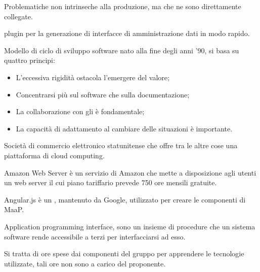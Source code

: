 





\makeFrontPage



\clearpage

\begin{itemize}


Problematiche non intrinseche alla produzione, ma che ne sono direttamente collegate.


 plugin per la generazione di interfacce di amministrazione dati in modo rapido.


Modello di ciclo di sviluppo software nato alla fine degli anni '90, si basa su quattro principi:
\begin{itemize}
 \item L'eccessiva rigidità ostacola l'emergere del valore;
 \item Concentrarsi più sul software che sulla documentazione;
 \item La collaborazione con gli  è fondamentale;
 \item La capacità di adattamento al cambiare delle situazioni è importante.
\end{itemize} 


Società di commercio elettronico statunitense che offre tra le altre cose una piattaforma di cloud computing.


Amazon Web Server è un servizio di Amazon che mette a disposizione agli utenti un web server il cui piano tariffario prevede 750 ore mensili gratuite.


Angular.js è un   , mantenuto da Google, utilizzato per creare le componenti  di MaaP.


Application programming interface, sono un insieme di procedure che un sistema software rende accessibile a terzi per interfacciarsi ad esso.


Si tratta di ore spese dai componenti del gruppo per apprendere le tecnologie utilizzate, tali ore non sono a carico del proponente.

\end{itemize}

